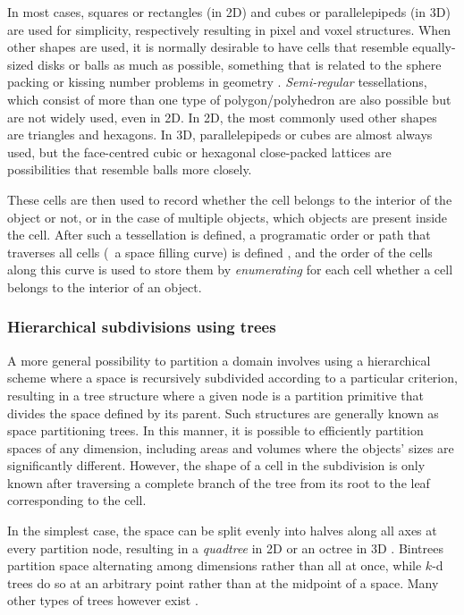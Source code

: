 In most cases, squares or rectangles (in 2D) and cubes or parallelepipeds (in 3D) are used for simplicity, respectively resulting in pixel and voxel structures.
When other shapes are used, it is normally desirable to have cells that resemble equally-sized disks or balls as much as possible, something that is related to the sphere packing or kissing number problems in geometry \citep{Conway92}.
\emph{Semi-regular} tessellations, which consist of more than one type of polygon/polyhedron are also possible but are not widely used, even in 2D.
In 2D, the most commonly used other shapes are triangles and hexagons.
In 3D, parallelepipeds or cubes are almost always used, but the face-centred cubic or hexagonal close-packed lattices are possibilities that resemble balls more closely.

These cells are then used to record whether the cell belongs to the interior of the object or not, or in the case of multiple objects, which objects are present inside the cell.
After such a tessellation is defined, a programatic order or path that traverses all cells (\ie\ a space filling curve) is defined \citep{Sagan94}, and the order of the cells along this curve is used to store them by \emph{enumerating} for each cell whether a cell belongs to the interior of an object.

\subsubsection{Hierarchical subdivisions using trees}

A more general possibility to partition a domain involves using a hierarchical scheme where a space is recursively subdivided according to a particular criterion, resulting in a tree structure where a given node is a partition primitive that divides the space defined by its parent.
Such structures are generally known as space partitioning trees.
In this manner, it is possible to efficiently partition spaces of any dimension, including areas and volumes where the objects' sizes are significantly different.
However, the shape of a cell in the subdivision is only known after traversing a complete branch of the tree from its root to the leaf corresponding to the cell.

In the simplest case, the space can be split evenly into halves along all axes at every partition node, resulting in a \emph{quadtree} in 2D \citep{Finkel74} or an octree in 3D \citep{Meagher80}.
Bintrees \citep{Samet85} partition space alternating among dimensions rather than all at once, while $k$-d trees \citep{Bentley75} do so at an arbitrary point rather than at the midpoint of a space.
Many other types of trees however exist \citep{Manolopoulos06}.

